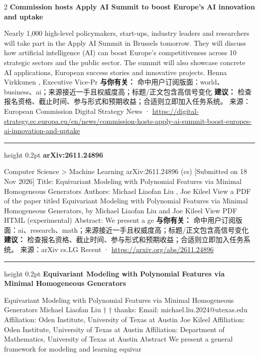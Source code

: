 \documentclass[10.5pt]{ctexart}
\begin{document}
\begin{multicols}{2}
{\large\bfseries Commission hosts Apply AI Summit to boost Europe’s AI innovation and uptake}\par
Nearly 1,000 high-level policymakers, start-ups, industry leaders and researchers will take part in the Apply AI Summit in Brussels tomorrow. They will discuss how artificial intelligence (AI) can boost Europe’s competitiveness across 10 strategic sectors and the public sector. The summit will also showcase concrete AI applications, European success stories and innovative projects. Henna Virkkunen , Executive Vice-Pr
\textbf{与你有关：} 命中用户订阅版面：world、business、ai；来源接近一手且权威度高；标题/正文包含高信号变化
\textbf{建议：} 检查报名资格、截止时间、参与形式和预期收益；合适则立即加入任务系统。
{\footnotesize\color{ormuted} 来源：European Commission Digital Strategy News · \url{https://digital-strategy.ec.europa.eu/en/news/commission-hosts-apply-ai-summit-boost-europes-ai-innovation-and-uptake}}
\vspace{2mm}
\hrule height 0.2pt
\vspace{2mm}
{\large\bfseries arXiv:2611.24896}\par
Computer Science > Machine Learning arXiv:2611.24896 (cs) [Submitted on 18 Nov 2026] Title: Equivariant Modeling with Polynomial Features via Minimal Homogeneous Generators Authors: Michael Liaofan Liu , Joe Kileel View a PDF of the paper titled Equivariant Modeling with Polynomial Features via Minimal Homogeneous Generators, by Michael Liaofan Liu and Joe Kileel View PDF HTML (experimental) Abstract: We present a ge
\textbf{与你有关：} 命中用户订阅版面：ai、research、math；来源接近一手且权威度高；标题/正文包含高信号变化
\textbf{建议：} 检查报名资格、截止时间、参与形式和预期收益；合适则立即加入任务系统。
{\footnotesize\color{ormuted} 来源：arXiv cs.LG Recent · \url{https://arxiv.org/abs/2611.24896}}
\vspace{2mm}
\hrule height 0.2pt
\vspace{2mm}
{\large\bfseries Equivariant Modeling with Polynomial Features via Minimal Homogeneous Generators}\par
Equivariant Modeling with Polynomial Features via Minimal Homogeneous Generators Michael Liaofan Liu † † thanks: Email: michael.liu.2024@utexas.edu Affiliation: Oden Institute, University of Texas at Austin Joe Kileel Affiliation: Oden Institute, University of Texas at Austin Affiliation: Department of Mathematics, University of Texas at Austin Abstract We present a general framework for modeling and learning equivar

\end{multicols}
\end{document}
